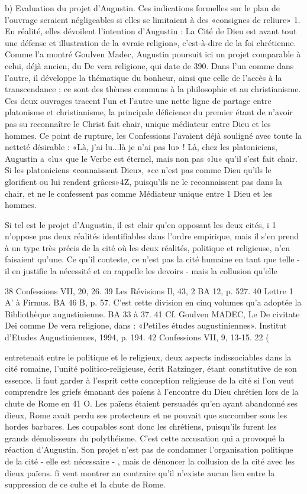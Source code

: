 b)	Evaluation du projet d'Augustin. Ces indications formelles sur le plan de l'ouvrage seraient négligeables si elles se limitaient à des «consignes de reliure» 1. En réalité, elles dévoilent l'intention d'Augustin : La Cité de Dieu est avant tout une défense et illustration  de  la «vraie religion», c'est-à-dire de la foi chrétienne. Comme l'a montré Goulven Madec, Augustin poursuit ici un projet comparable à celui, déjà ancien, du De vera religione, qui date de 390. Dans l'un comme dans l'autre, il développe la thématique du bonheur, ainsi que celle de l'accès à la transcendance : ce sont des thèmes communs à la philosophie et au christianisme. Ces deux ouvrages tracent l'un et l'autre une nette ligne de partage entre platonisme et christianisme, la principale déficience du premier étant de n'avoir pas su reconnaître le Christ fait chair, unique médiateur entre Dieu et les hommes. Ce point de rupture, les Confessions l'avaient déjà souligné avec toute la netteté désirable : «Là, j'ai lu...là je n'ai pas lu» ! Là, chez les platoniciens, Augustin a «lu» que le Verbe est éternel, mais non pas «lu» qu'il s'est fait chair. Si les platoniciens «connaissent Dieu», «ce n'est pas comme Dieu qu'ils le glorifient ou lui rendent grâces»4Z, puisqu'ils ne le
reconnaissent pas dans la chair, et ne le confessent pas comme Médiateur unique entre	1
Dieu et les hommes.

Si tel est le projet d'Augustin, il est clair qu'en opposant les deux cités, i 1 n'oppose pas deux  réalités  identifiables  dans l'ordre  empirique, mais il s'en prend à un type très précis de la cité où les deux réalités, politique et religieuse, n'en faisaient qu'une. Ce qu'il conteste, ce n'est pas la cité humaine en tant que telle - il en justifie la nécessité et en rappelle les devoirs  - mais la collusion qu'elle

38 Confessions VII, 20, 26.
39 Les Révisions Il, 43, 2 BA 12, p. 527.
40 Lettre 1 A' à Firmus. BA 46 B, p. 57. C'est cette division en cinq volumes qu'a adoptée la Bibliothèque augustinienne. BA 33 à 37.
41 Cf. Goulven MADEC, Le De civitate Dei comme De vera religione, dans : «Peti1es études augustiniennes». Institut d'Etudes Augustiniennes, 1994, p. 194.
42 Confessions VII, 9, 13-15.
22
(
 
entretenait entre le politique et le religieux, deux aspects indissociables dans la cité romaine, l'unité politico-religieuse, écrit Ratzinger, étant constitutive de son essence. li faut garder à l'esprit cette conception religieuse de la cité si l'on veut comprendre les griefs émanant des païens à l'encontre du Dieu chrétien lors de la chute de Rome en 41 O. Les païens étaient persuadés qu'en ayant abandonné ses dieux, Rome avait perdu ses protecteurs et ne pouvait que succomber sous les hordes barbares. Les coupables sont donc les chrétiens, puisqu'ils furent les grands démolisseurs du polythéisme. C'est cette accusation qui a provoqué la réaction d'Augustin. Son projet n'est pas de condamner l'organisation politique de la cité - elle est nécessaire - , mais de dénoncer la collusion de la cité avec les dieux païens. fi veut montrer au contraire qu'il n'existe aucun lien entre la suppression de ce culte et la chute de Rome.

